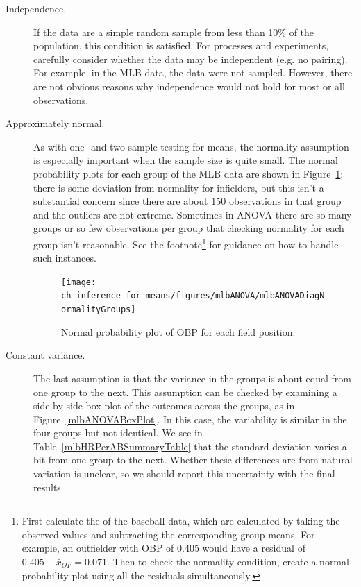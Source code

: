 \begin{description}
\item[Independence.] If the data are a simple random sample from less than 10\% of the population, this condition is satisfied. For processes and experiments, carefully consider whether the data may be independent (e.g. no pairing). For example, in the MLB data, the data were not sampled. However, there are not obvious reasons why independence would not hold for most or all observations.
\item[Approximately normal.] As with one- and two-sample testing for means, the normality assumption is especially important when the sample size is quite small. The normal probability plots for each group of the MLB data are shown in Figure~\ref{mlbANOVADiagNormalityGroups}; there is some deviation from normality for infielders, but this isn't a substantial concern since there are about 150 observations in that group and the outliers are not extreme. Sometimes in ANOVA there are so many groups or so few observations per group that checking normality for each group isn't reasonable. See the footnote\footnote{First calculate the  of the baseball data, which are calculated by taking the observed values and subtracting the corresponding group means. For example, an outfielder with OBP of 0.405 would have a residual of $0.405 - \bar{x}_{OF} = 0.071$. Then to check the normality condition, create a normal probability plot using all the residuals simultaneously.} for guidance on how to handle such instances.

\begin{figure}[hhh]
\centering
\texttt{[image: ch\_inference\_for\_means/figures/mlbANOVA/mlbANOVADiagNormalityGroups]}
\caption{Normal probability plot of OBP for each field position.}
\label{mlbANOVADiagNormalityGroups}
\end{figure}

\item[Constant variance.] The last assumption is that the variance in the groups is about equal from one group to the next. This assumption can be checked by examining a side-by-side box plot of the outcomes across the groups, as in Figure~\vref{mlbANOVABoxPlot}. In this case, the variability is similar in the four groups but not identical. We see in Table~\vref{mlbHRPerABSummaryTable} that the standard deviation varies a bit from one group to the next. Whether these differences are from natural variation is unclear, so we should report this uncertainty with the final results.


\end{description}

